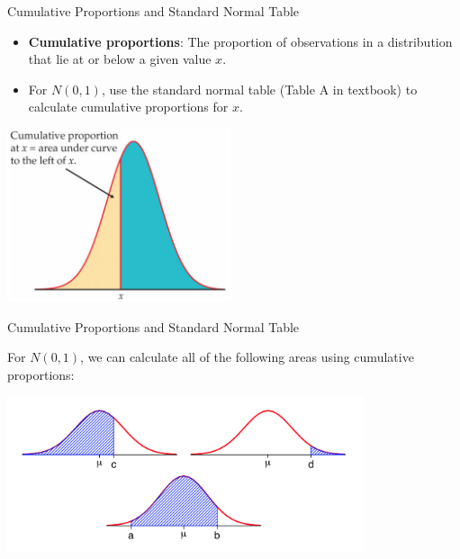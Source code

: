 \documentclass{beamer}\usepackage[]{graphicx}\usepackage[]{color}
\begin{document}
\begin{frame}{Cumulative Proportions and Standard Normal Table}

\begin{itemize}
\item \textbf{Cumulative proportions}: The proportion of observations in a distribution that lie at or below a given value $x$.
\item For $N(0,1)$, use the standard normal table (Table A in textbook) to calculate cumulative proportions for $x$.
\end{itemize}
\begin{center}
\includegraphics[height=2in]{P10.png}
\end{center}
\end{frame}


\begin{frame}{Cumulative Proportions and Standard Normal Table}

For $N(0,1)$, we can calculate all of the following areas using cumulative proportions:
\begin{center}
\includegraphics[height=1.8in]{P9.png}
\end{center}
\end{frame}
\end{document}
